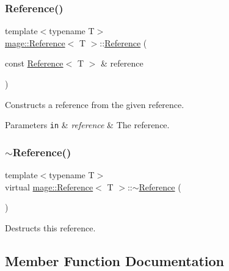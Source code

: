 \subsubsection{\texorpdfstring{Reference()}{Reference()}\hspace{0.1cm}{\footnotesize\ttfamily [2/2]}}
{\footnotesize\ttfamily template$<$typename T$>$ \\
\hyperlink{classmage_1_1_reference}{mage\+::\+Reference}$<$ T $>$\+::\hyperlink{classmage_1_1_reference}{Reference} (\begin{DoxyParamCaption}\item[{const \hyperlink{classmage_1_1_reference}{Reference}$<$ T $>$ \&}]{reference }\end{DoxyParamCaption})}

Constructs a reference from the given reference.


\begin{DoxyParams}[1]{Parameters}
\mbox{\tt in}  & {\em reference} & The reference. \\
\hline
\end{DoxyParams}
\hypertarget{classmage_1_1_reference_a88dd14871881ba478b5a86ce011775e7}{}\label{classmage_1_1_reference_a88dd14871881ba478b5a86ce011775e7} 
\subsubsection{\texorpdfstring{$\sim$\+Reference()}{~Reference()}}
{\footnotesize\ttfamily template$<$typename T$>$ \\
virtual \hyperlink{classmage_1_1_reference}{mage\+::\+Reference}$<$ T $>$\+::$\sim$\hyperlink{classmage_1_1_reference}{Reference} (\begin{DoxyParamCaption}{ }\end{DoxyParamCaption})\hspace{0.3cm}{\ttfamily [virtual]}}

Destructs this reference. 

\subsection{Member Function Documentation}
\hypertarget{classmage_1_1_reference_a88ee2da25d2ce963e8015080565c9bd1}{}\label{classmage_1_1_reference_a88ee2da25d2ce963e8015080565c9bd1} 
